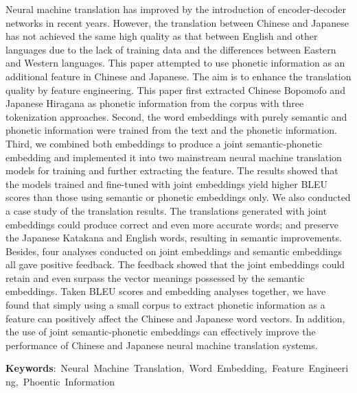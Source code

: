 Neural machine translation has improved by the introduction of encoder-decoder networks in recent years. However, the translation between Chinese and Japanese has not achieved the same high quality as that between English and other languages due to the lack of training data and the differences between Eastern and Western languages. This paper attempted to use phonetic information as an additional feature in Chinese and Japanese. The aim is to enhance the translation quality by feature engineering. This paper first extracted Chinese Bopomofo and Japanese Hiragana as phonetic information from the corpus with three tokenization approaches. Second, the word embeddings with purely semantic and phonetic information were trained from the text and the phonetic information. Third, we combined both embeddings to produce a joint semantic-phonetic embedding and implemented it into two mainstream neural machine translation models for training and further extracting the feature. The results showed that the models trained and fine-tuned with joint embeddings yield higher BLEU scores than those using semantic or phonetic embeddings only. We also conducted a case study of the translation results. The translations generated with joint embeddings could produce correct and even more accurate words; and preserve the Japanese Katakana and English words, resulting in semantic improvements. Besides, four analyses conducted on joint embeddings and semantic embeddings all gave positive feedback. The feedback showed that the joint embeddings could retain and even surpass the vector meanings possessed by the semantic embeddings. Taken BLEU scores and embedding analyses together, we have found that simply using a small corpus to extract phonetic information as a feature can positively affect the Chinese and Japanese word vectors. In addition, the use of joint semantic-phonetic embeddings can effectively improve the performance of Chinese and Japanese neural machine translation systems.


\begin{flushleft}
\mbox{{\bf Keywords}: Neural Machine Translation, Word Embedding, Feature Engineering, Phoentic Information}
\end{flushleft}